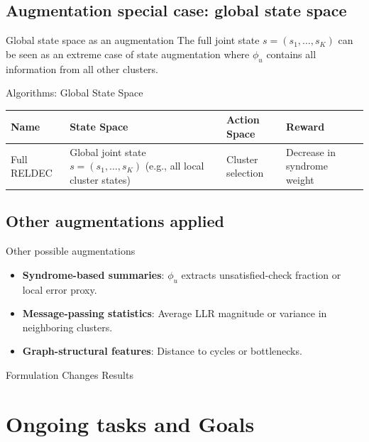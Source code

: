 \documentclass{beamer}
\begin{document}
\subsection{Augmentation special case: global state space}

\begin{frame}{Global state space as an augmentation}
The full joint state $s=(s_1,\dots,s_K)$ can be seen as an extreme case of state augmentation where $\phi_u$ contains all information from all other clusters.
\end{frame}

\begin{frame}{Algorithms: Global State Space}
\begin{table}
\centering
\begin{tabularx}{\textwidth}{>{\raggedright\arraybackslash}p{2.5cm} X X X}
\toprule
\textbf{Name} & \textbf{State Space} & \textbf{Action Space} & \textbf{Reward} \\
\midrule
Full RELDEC & Global joint state $s=(s_1,\dots,s_K)$ (e.g., all local cluster states) & Cluster selection & Decrease in syndrome weight \\
\bottomrule
\end{tabularx}
\end{table}
\end{frame}

\subsection{Other augmentations applied}

\begin{frame}{Other possible augmentations}
\begin{itemize}
  \item \textbf{Syndrome-based summaries}: $\phi_u$ extracts unsatisfied-check fraction or local error proxy.
  \item \textbf{Message-passing statistics}: Average LLR magnitude or variance in neighboring clusters.
  \item \textbf{Graph-structural features}: Distance to cycles or bottlenecks.
\end{itemize}
\end{frame}

\begin{frame}{Formulation Changes Results}
\end{frame}

\section{Ongoing tasks and Goals}
\end{document}
